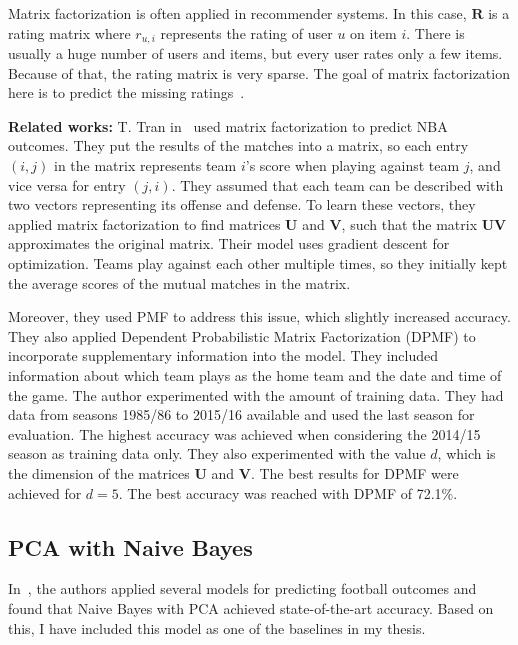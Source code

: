 \documentclass[thesis=M,english]{FITthesis}[2019/12/23]
\begin{document}
Matrix factorization is often applied in recommender systems. In this case, $\boldsymbol{R}$ is a rating matrix where $r_{u, i}$ represents the rating of user $u$ on item $i$. There is usually a huge number of users and items, but every user rates only a few items. Because of that, the rating matrix is very sparse. The goal of matrix factorization here is to predict the missing ratings~\cite{mf}.

\noindent \textbf{Related works:} T. Tran in~\cite{NBA_matrix_factorization} used matrix factorization to predict NBA outcomes. They put the results of the matches into a matrix, so each entry $(i, j)$ in the matrix represents team $i$’s score when playing against team $j$, and vice versa for entry $(j, i)$. They assumed that each team can be described with two vectors representing its offense and defense. To learn these vectors, they applied matrix factorization to find matrices $\boldsymbol{U}$ and $\boldsymbol{V}$, such that the matrix $\boldsymbol{U} \boldsymbol{V}$ approximates the original matrix. Their model uses gradient descent for optimization. Teams play against each other multiple times, so they initially kept the average scores of the mutual matches in the matrix.

Moreover, they used PMF to address this issue, which slightly increased accuracy. They also applied Dependent Probabilistic Matrix Factorization (DPMF) to incorporate supplementary information into the model. They included information about which team plays as the home team and the date and time of the game. The author experimented with the amount of training data. They had data from seasons 1985/86 to 2015/16 available and used the last season for evaluation. The highest accuracy was achieved when considering the 2014/15 season as training data only. They also experimented with the value $d$, which is the dimension of the matrices $\boldsymbol{U}$ and $\boldsymbol{V}$. The best results for DPMF were achieved for $d=5$. The best accuracy was reached with DPMF of 72.1\%.

\subsection{PCA with Naive Bayes}
In~\cite{Dutch_football}, the authors applied several models for predicting football outcomes and found that Naive Bayes with PCA achieved state-of-the-art accuracy. Based on this, I have included this model as one of the baselines in my thesis.
\end{document}
